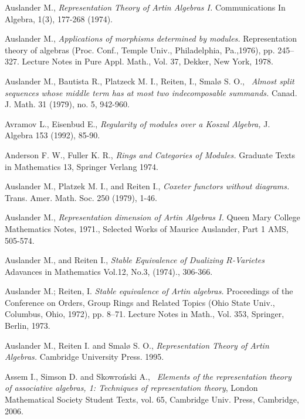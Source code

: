 \documentclass{amsart}
\theoremstyle{plain}
\numberwithin{equation}{section}
\begin{document}
\begin{thebibliography}{ABPRS}
 Auslander M., \textsl{Representation Theory of Artin
Algebras I.} Communications In Algebra, 1(3), 177-268 (1974).

 Auslander M., \textsl{Applications of morphisms determined
by modules.} Representation theory of algebras (Proc. Conf., Temple Univ.,
Philadelphia, Pa.,1976), pp. 245--327. Lecture Notes in Pure Appl. Math.,
Vol. 37, Dekker, New York, 1978.

 Auslander M., Bautista R., Platzeck M. I., Reiten,
I., Smal\o {} S. O., \textsl{\ Almost split sequences whose middle term has
at most two indecomposable summands.} Canad. J. Math. 31 (1979), no. 5,
942-960.

 Avramov L., Eisenbud E., \textsl{Regularity of modules over
a Koszul Algebra, } J. Algebra 153 (1992), 85-90.

 Anderson F. W., Fuller K. R., \textsl{Rings
and Categories of Modules.} Graduate Texts in Mathematics 13, Springer
Verlang 1974.

 Auslander M., Platzek M. I., and Reiten I., \textsl{Coxeter functors without diagrams.} Trans. Amer. Math. Soc. 250 (1979), 1-46.

 Auslander M., \textsl{Representation dimension of Artin
Algebras I.} Queen Mary College Mathematics Notes, 1971., Selected Works of
Maurice Auslander, Part 1 AMS, 505-574.

 Auslander M., and Reiten I., \textsl{Stable
Equivalence of Dualizing $R$-Varietes} Adavances in Mathematics Vol.12,
No.3, (1974)., 306-366.

 Auslander M.; Reiten, I. \textsl{Stable equivalence of
Artin algebras.} Proceedings of the Conference on Orders, Group Rings and
Related Topics (Ohio State Univ., Columbus, Ohio, 1972), pp. 8--71. Lecture
Notes in Math., Vol. 353, Springer, Berlin, 1973.

 Auslander M., Reiten I. and Smal\o {} S. O., \textsl{Representation Theory of Artin Algebras.} Cambridge University Press. 1995.

 Assem I., Simson D. and Skowro\'nski A., \textsl{\
Elements of the representation theory of associative algebras, 1: Techniques
of representation theory}, London Mathematical Society Student Texts, vol.
65, Cambridge Univ. Press, Cambridge, 2006.


\end{thebibliography}
\end{document}
